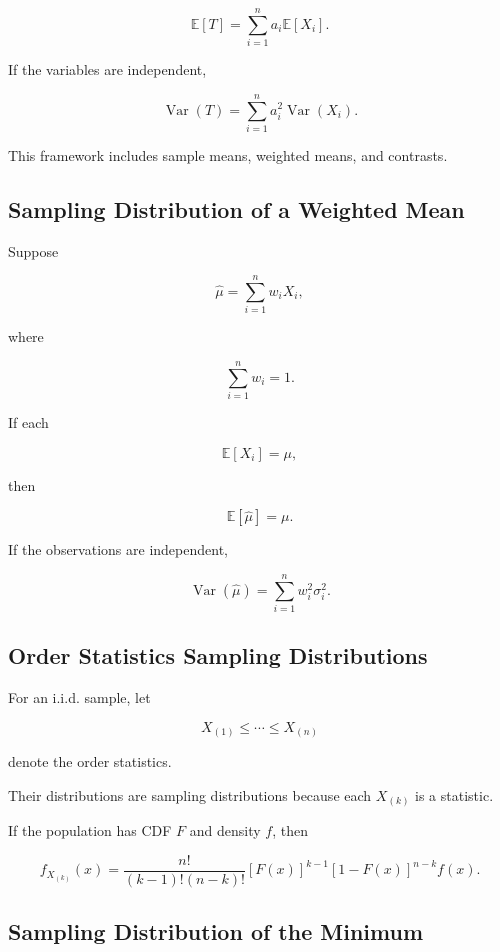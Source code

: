 \[
\boxed{
\mathbb{E}[T]
=
\sum_{i=1}^{n}
a_i\mathbb{E}[X_i].
}
\]

If the variables are independent,

\[
\boxed{
\operatorname{Var}(T)
=
\sum_{i=1}^{n}
a_i^2
\operatorname{Var}(X_i).
}
\]

This framework includes sample means, weighted means, and contrasts.

\subsection{Sampling Distribution of a Weighted Mean}
\label{subsec:sampling-weighted-mean}

Suppose

\[
\widehat{\mu}
=
\sum_{i=1}^{n}
w_iX_i,
\]

where

\[
\sum_{i=1}^{n}w_i=1.
\]

If each

\[
\mathbb{E}[X_i]=\mu,
\]

then

\[
\boxed{
\mathbb{E}[\widehat{\mu}]
=
\mu.
}
\]

If the observations are independent,

\[
\boxed{
\operatorname{Var}(\widehat{\mu})
=
\sum_{i=1}^{n}
w_i^2\sigma_i^2.
}
\]

\subsection{Order Statistics Sampling Distributions}
\label{subsec:order-statistics-sampling}

For an i.i.d. sample, let

\[
X_{(1)}
\leq
\cdots
\leq
X_{(n)}
\]

denote the order statistics.

Their distributions are sampling distributions because each
\(X_{(k)}\) is a statistic.

If the population has CDF \(F\) and density \(f\), then

\[
\boxed{
f_{X_{(k)}}(x)
=
\frac{
n!
}{
(k-1)!(n-k)!
}
[F(x)]^{k-1}
[1-F(x)]^{n-k}
f(x).
}
\]

\subsection{Sampling Distribution of the Minimum}
\label{subsec:sample-minimum-distribution}

